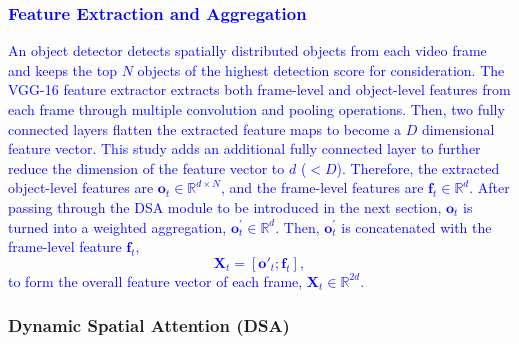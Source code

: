\documentclass[journal]{IEEEtran}
\begin{document}
\subsubsection{\textcolor{blue}{Feature Extraction and Aggregation}}

\textcolor{blue}{
An object detector detects spatially distributed objects from each video frame and keeps the top $N$ objects of the highest detection score for consideration. The VGG-16 \cite{Simonyan15} feature extractor extracts both frame-level and object-level features from each frame  through multiple convolution and pooling operations. Then, two fully connected layers flatten the extracted feature maps to become a $D$ dimensional feature vector. This study adds an additional fully connected layer to further reduce the dimension of the feature vector to $d$ ($<D$). Therefore, the extracted object-level features are $\boldsymbol{o}_t\in\mathbb{R}^{d\times N}$, and the frame-level features are $\boldsymbol{f}_t\in\mathbb{R}^{d}$. After passing through the DSA module to be introduced in the next section, $\boldsymbol{o}_t$ is turned into a weighted aggregation,  $\boldsymbol{o}^\prime_t \in\mathbb{R}^{d}$. Then, $\boldsymbol{o}^\prime_t$ is concatenated with the frame-level feature $\boldsymbol{f}_t$,
\begin{equation}
    \boldsymbol{X}_t = [\boldsymbol{o}'_t;\boldsymbol{f}_t],
\end{equation}
to form the overall feature vector of each frame, $\boldsymbol{X}_t\in\mathbb{R}^{2d}$.}


\subsubsection{Dynamic Spatial Attention (DSA)}
\label{sub:sa}
\end{document}
